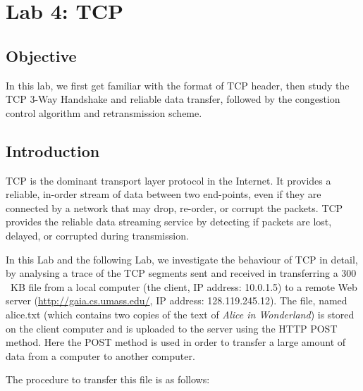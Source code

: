 \chapter{Lab 4: TCP}

\section{Objective}

\hspace*{0.5cm} In this lab, we first get familiar with the format of
TCP header, then study the TCP 3-Way Handshake and reliable
data transfer, followed by the congestion
control algorithm and retransmission scheme.

\section{Introduction}

\hspace*{0.5cm} TCP is the dominant
transport layer protocol in the Internet. It provides a reliable, in-order
stream of data between two end-points, even if they
are connected by a network that may drop, re-order, or corrupt the
packets. TCP provides the reliable data streaming service by detecting if
packets are lost, delayed, or corrupted during transmission.

In this Lab and the following Lab, we investigate the behaviour of TCP
in detail, by analysing a trace of the TCP segments sent
and received in transferring a $300$~KB file from a local computer (the
client, IP address: 10.0.1.5) to a remote Web server
(\url{http://gaia.cs.umass.edu/}, IP address: 128.119.245.12). The
file, named alice.txt (which contains two copies of the text of {\em
  Alice in Wonderland}) is stored on the client computer and is
uploaded to the server using the HTTP POST method. Here the POST
method is used in order to transfer a large amount of data from a
computer to another computer.

The procedure to transfer this file is as follows:

